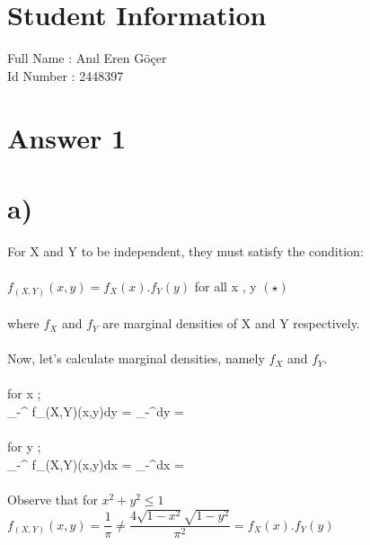 \documentclass[11pt]{article}
\begin{document}
\section*{Student Information } 
Full Name :  Anıl Eren Göçer \\
Id Number :  2448397 \\

\section*{Answer 1} 
\section*{a)}
For X and Y to be independent, they must satisfy the condition: \\ \\
\indent $f_{(X,Y)}(x,y) = f_X(x) . f_Y(y)$  \indent for all x \in [-1,1] , y \in [-1,1] \indent $(\star)$ \\ \\
where $f_X$ and $f_Y$ are marginal densities of X and Y respectively.  \\ \\
Now, let's calculate marginal densities, namely $f_X$ and $f_Y$. \\ \\

for x \in [-1,1]; \\

\int_{-}^{} f_{(X,Y)}(x,y)dy = \int_{-}^{}dy =  \\ \\

for y \in [-1,1]; \\

\int_{-}^{} f_{(X,Y)}(x,y)dx = \int_{-}^{}dx =  \\ \\

\noindent Observe that for $x^2 + y^2 \leq 1$  \\

$f_{(X,Y)}(x,y) = \dfrac{1}{\pi} \neq \dfrac{4\sqrt{1-x^2}\sqrt{1-y^2}}{\pi^2} = f_X(x).f_Y(y)$  \\ \\
\end{document}
